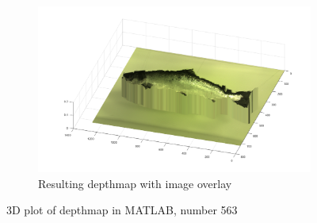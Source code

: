\begin{figure}[H]
    \medskip
    \begin{subfigure}{1\textwidth}
        \centering
        \includegraphics[width=.9\linewidth]{images/results/3D_plots/fixed_3D_fish_63}
        \caption{Resulting depthmap with image overlay} 
        \label{fig:3D_fixed_fish_63}
    \end{subfigure}\hspace*{\fill}
    \caption{3D plot of depthmap in MATLAB, number 563}
    \label{fig:3D_plot_63}
\end{figure}


